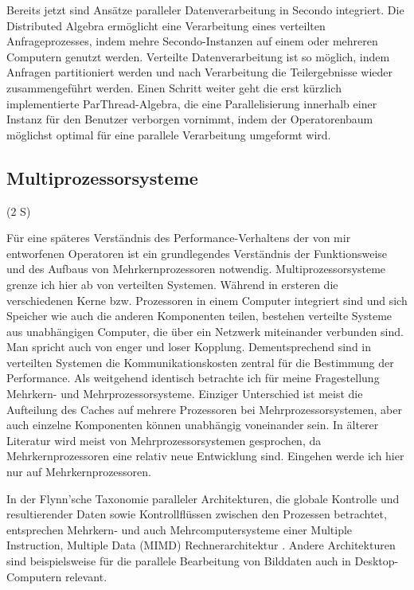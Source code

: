 \documentclass[a4paper,12pt,twoside]{article}
\begin{document}
Bereits jetzt sind Ansätze paralleler Datenverarbeitung in Secondo integriert. Die Distributed Algebra {\autocite{Nidzwetzki2017}} ermöglicht eine Verarbeitung eines verteilten Anfrageprozesses, indem mehre Secondo-Instanzen auf einem oder mehreren Computern genutzt werden. Verteilte Datenverarbeitung ist so möglich, indem Anfragen partitioniert werden und nach Verarbeitung die Teilergebnisse wieder zusammengeführt werden. Einen Schritt weiter geht die erst kürzlich implementierte ParThread-Algebra, die eine Parallelisierung innerhalb einer Instanz für den Benutzer verborgen vornimmt, indem der Operatorenbaum möglichst optimal für eine parallele Verarbeitung umgeformt wird.

\subsection{Multiprozessorsysteme} (2 S)

Für eine späteres Verständnis des Performance-Verhaltens der von mir entworfenen Operatoren ist ein grundlegendes Verständnis der Funktionsweise und des Aufbaus von Mehrkernprozessoren notwendig. Multiprozessorsysteme grenze ich hier ab von verteilten Systemen. Während in ersteren die verschiedenen Kerne bzw. Prozessoren in einem Computer integriert sind und sich Speicher wie auch die anderen Komponenten teilen, bestehen verteilte Systeme aus unabhängigen Computer, die über ein Netzwerk miteinander verbunden sind. Man spricht auch von enger und loser Kopplung. Dementsprechend sind in verteilten Systemen die Kommunikationskosten zentral für die Bestimmung der Performance. Als weitgehend identisch betrachte ich für meine Fragestellung Mehrkern- und Mehrprozessorsysteme. Einziger Unterschied ist meist die Aufteilung des Caches auf mehrere Prozessoren bei Mehrprozessorsystemen, aber auch einzelne Komponenten können unabhängig voneinander sein. In älterer Literatur wird meist von Mehrprozessorsystemen gesprochen, da Mehrkernprozessoren eine relativ neue Entwicklung sind. Eingehen werde ich hier nur auf Mehrkernprozessoren.

In der Flynn’sche Taxonomie paralleler Architekturen, die globale Kontrolle und resultierender Daten sowie Kontrollflüssen zwischen den Prozessen betrachtet, entsprechen Mehrkern- und auch Mehrcomputersysteme einer Multiple Instruction, Multiple Data (MIMD) Rechnerarchitektur {\autocite[S. 10f]{Rauber2013}}. Andere Architekturen sind beispielsweise für die parallele Bearbeitung von Bilddaten auch in Desktop-Computern relevant.
\end{document}
